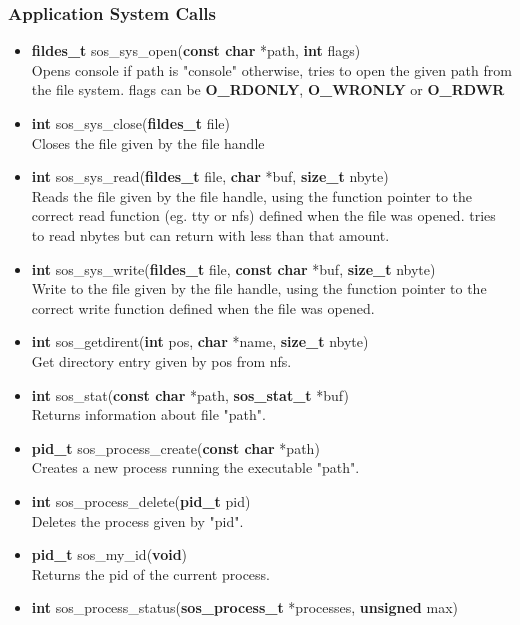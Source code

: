 \documentclass[12pt]{article}
\begin{document}
\subsubsection{Application System Calls}
\begin{itemize}
\item \textbf{fildes\_t} sos\_sys\_open(\textbf{const char} *path, \textbf{int} flags)\\
Opens console if path is "console" otherwise, tries to open the given path from the file system.
flags can be \textbf{O\_RDONLY}, \textbf{O\_WRONLY} or \textbf{O\_RDWR}
\item \textbf{int} sos\_sys\_close(\textbf{fildes\_t} file)\\
Closes the file given by the file handle
\item \textbf{int} sos\_sys\_read(\textbf{fildes\_t} file, \textbf{char} *buf, \textbf{size\_t} nbyte)\\
Reads the file given by the file handle, using the function pointer to the correct read function (eg. tty or nfs) defined when the file was opened. tries to read nbytes but can return with less than that amount.
\item \textbf{int} sos\_sys\_write(\textbf{fildes\_t} file, \textbf{const char} *buf, \textbf{size\_t} nbyte)\\
Write to the file given by the file handle, using the function pointer to the correct write function defined when the file was opened.
\item \textbf{int} sos\_getdirent(\textbf{int} pos, \textbf{char} *name, \textbf{size\_t} nbyte)\\
Get directory entry given by pos from nfs.
\item \textbf{int} sos\_stat(\textbf{const char} *path, \textbf{sos\_stat\_t} *buf)\\
Returns information about file "path".
\item \textbf{pid\_t} sos\_process\_create(\textbf{const char} *path)\\
Creates a new process running the executable "path".
\item \textbf{int} sos\_process\_delete(\textbf{pid\_t} pid)\\
Deletes the process given by "pid".
\item \textbf{pid\_t} sos\_my\_id(\textbf{void})\\
Returns the pid of the current process.
\item \textbf{int} sos\_process\_status(\textbf{sos\_process\_t} *processes, \textbf{unsigned} max)\\

\end{itemize}
\end{document}
